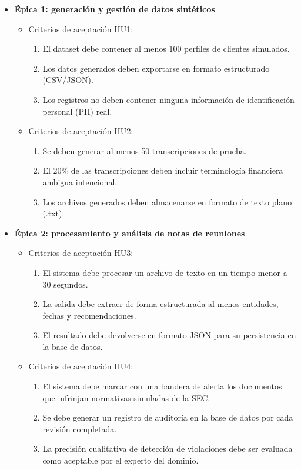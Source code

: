 \documentclass[
11pt, %
]{charter}
\begin{document}
\begin{itemize}
  \item \textbf{\'{E}pica 1: generación y gestión de datos sintéticos}
    \begin{itemize}
      \item Criterios de aceptación HU1:
        \begin{enumerate}
          \item El dataset debe contener al menos 100 perfiles de clientes simulados.
          \item Los datos generados deben exportarse en formato estructurado (CSV/JSON).
          \item Los registros no deben contener ninguna información de identificación personal (PII) real.
        \end{enumerate}
      \item Criterios de aceptación HU2:
        \begin{enumerate}
          \item Se deben generar al menos 50 transcripciones de prueba.
          \item El 20\% de las transcripciones deben incluir terminología financiera ambigua intencional.
          \item Los archivos generados deben almacenarse en formato de texto plano (.txt).
        \end{enumerate}
    \end{itemize}
    
  \item \textbf{\'{E}pica 2: procesamiento y análisis de notas de reuniones}
    \begin{itemize}
      \item Criterios de aceptación HU3:
        \begin{enumerate}
          \item El sistema debe procesar un archivo de texto en un tiempo menor a 30 segundos.
          \item La salida debe extraer de forma estructurada al menos entidades, fechas y recomendaciones.
          \item El resultado debe devolverse en formato JSON para su persistencia en la base de datos.
        \end{enumerate}
      \item Criterios de aceptación HU4:
        \begin{enumerate}
          \item El sistema debe marcar con una bandera de alerta los documentos que infrinjan normativas simuladas de la SEC.
          \item Se debe generar un registro de auditoría en la base de datos por cada revisión completada.
          \item La precisión cualitativa de detección de violaciones debe ser evaluada como aceptable por el experto del dominio.
        \end{enumerate}
    \end{itemize}
    

\end{itemize}
\end{document}
